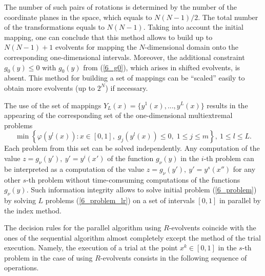 The number of such pairs of rotations is determined by the number of the coordinate planes in the space, which equals to  $N(N-1)/2$. The total number of the transformations equals to $N(N-1)$. Taking into account the initial mapping, one can conclude that this method allows to build up to $N(N-1)+1$ evolvents for mapping the $N$-dimensional domain onto the corresponding one-dimensional intervals. Moreover, the additional constraint  $g_0(y) \leq 0$ with $g_0(y)$ from (\ref{6_g0}), which arises in shifted evolvents, is absent. This method for building a set of mappings can be ``scaled'' easily to obtain more evolvents (up to $2^N$) if necessary.

The use of the set of mappings $Y_L(x)=\{y^1(x),...,y^L(x)\}$ results in the appearing of the corresponding set of the one-dimensional multiextremal problems 
\begin{equation}\label{6_problem_lr} 
\min{\left\{\varphi(y^l(x)):x\in [0,1], \; g_j(y^l(x))\leq 0, \; 1 \leq j \leq m\right\}}, \ 1 \leq l \leq L.
\end{equation} 
Each problem from this set can be solved independently. Any computation of the value $z=g_\nu(y'),\ y'=y^i(x')$ of the function $g_\nu(y)$ in the $i$-th problem can be interpreted as a computation of the value $z=g_\nu(y'),\ y'=y^s(x'')$ for any other $s$-th problem without time-comsuming computations of the functions $g_\nu(y)$. Such information integrity allows to solve  initial problem (\ref{6_problem}) by solving $L$ problems (\ref{6_problem_lr}) on a set of intervals $[0,1]$ in parallel by the index method. 

The decision rules for the parallel algorithm using $R$-evolvents coincide with the ones of the sequential algorithm almost completely except the method of the trial execution. Namely, the execution of a trial at the point $x^k \in [0,1]$ in the $s$-th problem in the case of using $R$-evolvents consists in the following sequence of operations.

